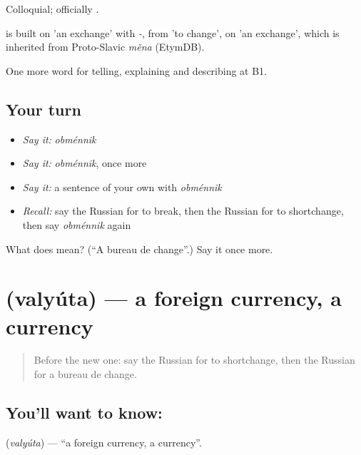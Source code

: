 Colloquial; officially \emph{ }.

\begin{cousinweb}
\emph{} is built on \emph{} 'an exchange' with \emph{-}, from \emph{} 'to change', on \emph{} 'an exchange', which is inherited from Proto-Slavic \emph{měna} (EtymDB).
\end{cousinweb}

\begin{grammarlens}[title={What you've built}]
One more word for telling, explaining and describing at B1.
\end{grammarlens}

\subsection*{Your turn}
\begin{itemize}
\raggedright
  \item \emph{Say it:} \emph{obménnik}
  \item \emph{Say it:} \emph{obménnik}, once more
  \item \emph{Say it:} a sentence of your own with \emph{obménnik}
  \item \emph{Recall:} say the Russian for to break, then the Russian for to shortchange, then say \emph{obménnik} again
\end{itemize}

\begin{tcolorbox}[breakable,colback=teal!4,colframe=teal!35!black,title={Before you move on}]
What does  mean? (\textquotedblleft{}A bureau de change\textquotedblright{}.) Say it once more.
\end{tcolorbox}
\section[\texorpdfstring{\ru{валюта} (valyúta)}{валюта (valyúta)}]{ (valyúta) — a foreign currency, a currency}

\label{lesson:RU-C456-valyuta}



\begin{quote}
Before the new one: say the Russian for to shortchange, then the Russian for a bureau de change.
\end{quote}

\subsection*{You'll want to know: }
\textbf{} (\emph{valyúta}) — \textquotedblleft{}a foreign currency, a currency\textquotedblright{}.

